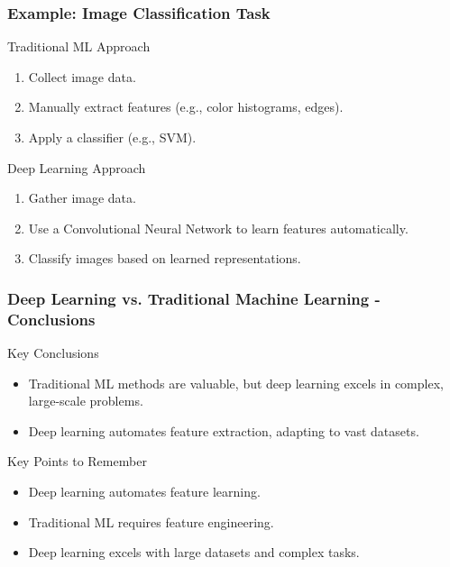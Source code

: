 \documentclass[aspectratio=169]{beamer}
\begin{document}
\begin{frame}[fragile]
    \frametitle{Example: Image Classification Task}
    \begin{block}{Traditional ML Approach}
        \begin{enumerate}
            \item Collect image data.
            \item Manually extract features (e.g., color histograms, edges).
            \item Apply a classifier (e.g., SVM).
        \end{enumerate}
    \end{block}
    
    \begin{block}{Deep Learning Approach}
        \begin{enumerate}
            \item Gather image data.
            \item Use a Convolutional Neural Network to learn features automatically.
            \item Classify images based on learned representations.
        \end{enumerate}
    \end{block}
\end{frame}

\begin{frame}[fragile]
    \frametitle{Deep Learning vs. Traditional Machine Learning - Conclusions}
    \begin{block}{Key Conclusions}
        \begin{itemize}
            \item Traditional ML methods are valuable, but deep learning excels in complex, large-scale problems.
            \item Deep learning automates feature extraction, adapting to vast datasets.
        \end{itemize}
    \end{block}
    
    \begin{block}{Key Points to Remember}
        \begin{itemize}
            \item Deep learning automates feature learning.
            \item Traditional ML requires feature engineering.
            \item Deep learning excels with large datasets and complex tasks.
        \end{itemize}
    \end{block}
\end{frame}
\end{document}
